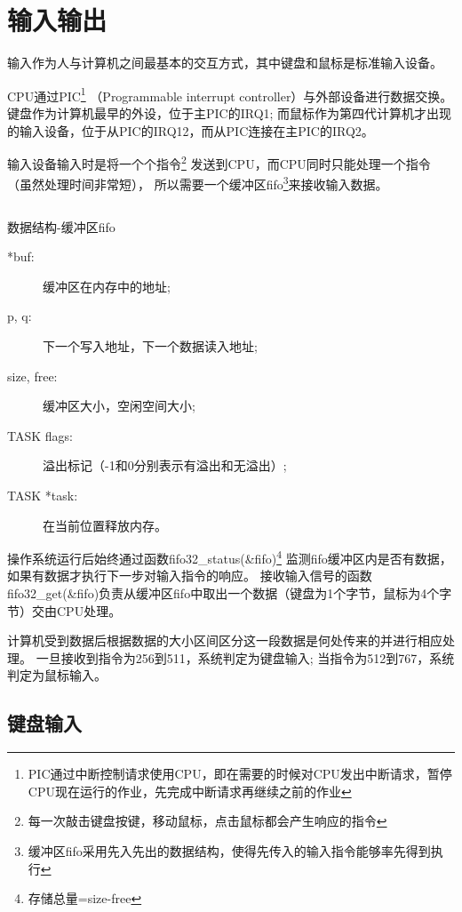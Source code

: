 \section{输入输出}

输入作为人与计算机之间最基本的交互方式，其中键盘和鼠标是标准输入设备。

CPU通过PIC\footnote{PIC通过中断控制请求使用CPU，即在需要的时候对CPU发出中断请求，暂停CPU现在运行的作业，先完成中断请求再继续之前的作业}
（Programmable interrupt controller）与外部设备进行数据交换。
键盘作为计算机最早的外设，位于主PIC的IRQ1;
而鼠标作为第四代计算机才出现的输入设备，位于从PIC的IRQ12，而从PIC连接在主PIC的IRQ2。

输入设备输入时是将一个个指令\footnote{每一次敲击键盘按键，移动鼠标，点击鼠标都会产生响应的指令}
发送到CPU，而CPU同时只能处理一个指令（虽然处理时间非常短），
所以需要一个缓冲区fifo\footnote{缓冲区fifo采用先入先出的数据结构，使得先传入的输入指令能够率先得到执行}来接收输入数据。

\begin{listing}[H]
  \inputminted[tabsize=2, firstline=40, lastline=44,
  linenos=true]{c}{../ZOS/src/kernel/bootpack.h}
  \caption{数据结构-缓冲区fifo}
        \label{lst:fifo}
\end{listing}
\begin{description}
  \item[*buf:]缓冲区在内存中的地址;
  \item[p, q:]下一个写入地址，下一个数据读入地址;
  \item[size, free:]缓冲区大小，空闲空间大小;
  \item[TASK flags:]溢出标记（-1和0分别表示有溢出和无溢出）;
  \item[TASK *task:]在当前位置释放内存。
  \end{description}

操作系统运行后始终通过函数fifo32\_status(\&fifo)\footnote{存储总量=size-free}
监测fifo缓冲区内是否有数据，如果有数据才执行下一步对输入指令的响应。
接收输入信号的函数fifo32\_get(\&fifo)负责从缓冲区fifo中取出一个数据（键盘为1个字节，鼠标为4个字节）交由CPU处理。

计算机受到数据后根据数据的大小区间区分这一段数据是何处传来的并进行相应处理。
一旦接收到指令为256到511，系统判定为键盘输入;
当指令为512到767，系统判定为鼠标输入。


\subsection{键盘输入}

